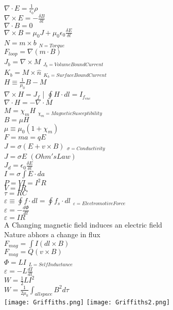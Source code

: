 \documentclass[1pt]{report}
\begin{document}
\begin{multicols}{3}
\begin{flushleft}

$\nabla\cdot E=\frac{1}{\epsilon_0}\rho$\\
$\nabla\times E=-\frac{\delta B}{\delta t}$\\
$\nabla\cdot B=0$\\
$\nabla\times B=\mu_0J+\mu_0\epsilon_0\frac{\delta E}{\delta t}$\\

$N=m\times b$ $_{N=Torque}$\\
$F_{loop}=\nabla(m\cdot B)$\\
$J_b=\nabla\times M$ $_{J_b=VolumeBoundCurrent}$\\
$K_b=M\times\hat{n}$ $_{K_b=SurfaceBoundCurrent}$\\
$H\equiv\frac{1}{\mu_0}B-M$\\
$\nabla\times H=J_f$ | $\oint H\cdot dl=I_{f_{enc}}$\\
$\nabla\cdot H=-\nabla\cdot M$\\
$M=\chi_m H$ $_{\chi_m=MagneticSusceptibility}$\\
$B=\mu H$\\
$\mu\equiv\mu_0 (1+\chi_m)$\\

$F=ma=qE$\\
$J=\sigma(E+v\times B)$ $_{\sigma=Conductivity}$\\
$J=\sigma E$ $(Ohm's Law)$\\
$J_d=\epsilon_0\frac{\delta E}{\delta t}$\\
$I=\sigma\int E\cdot da$\\
$P=VI=I^2R$\\
$V=IR$\\
$\tau=RC$\\
$\varepsilon\equiv\oint f\cdot dl=\oint f_s\cdot dl$ $_{\varepsilon=ElectromotiveForce}$\\
$\varepsilon=-\frac{d\Phi}{dt}$\\
$\varepsilon=IR$\\
A Changing magnetic field induces an electric field\\
Nature abhors a change in flux\\
$F_{mag}=\int I(dl\times B)$\\
$F_{mag}=Q(v\times B)$\\
$\Phi=LI$ $_{L=SelfInductance}$\\
$\varepsilon=-L\frac{dI}{dt}$\\
$W=\frac{1}{2}LI^2$\\
$W=\frac{1}{2\mu_0}\int_{all space} B^2d\tau$\\
\texttt{[image: Griffiths.png]}
\texttt{[image: Griffiths2.png]}
\end{flushleft}
\end{multicols}
\end{document}
